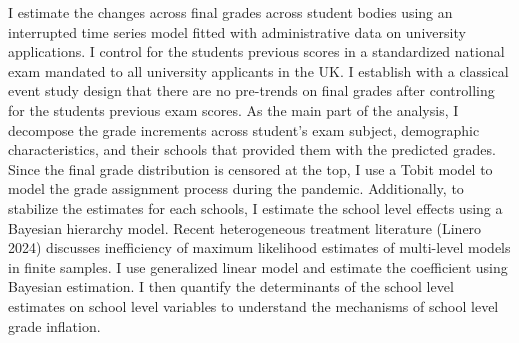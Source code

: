 I estimate the changes across final grades across student bodies using an interrupted time series model fitted with administrative data on university applications. I control for the students previous scores in a standardized national exam mandated to all university applicants in the UK. I establish with a classical event study design that there are no pre-trends on final grades after controlling for the students previous exam scores. As the main part of the analysis, I decompose the grade increments across student's exam subject, demographic characteristics, and their schools that provided them with the predicted grades. Since the final grade distribution is censored at the top, I use a Tobit model to model the grade assignment process during the pandemic. Additionally, to stabilize the estimates for each schools, I estimate the school level effects using a Bayesian hierarchy model. Recent heterogeneous treatment literature (Linero 2024) discusses inefficiency of maximum likelihood estimates of multi-level models in finite samples. I use generalized linear model and estimate the coefficient using Bayesian estimation. I then quantify the determinants of the school level estimates on school level variables to understand the mechanisms of school level grade inflation. 


